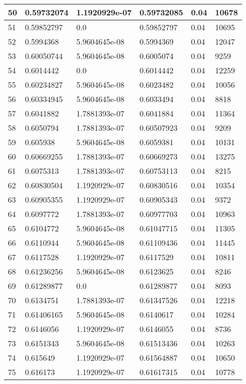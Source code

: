 \begin{longtable}{|l|l|l|l|l|l|}
50 & 0.59732074 & 1.1920929e-07 & 0.59732085 & 0.04 & 10678 \\ \hline 
51 & 0.59852797 & 0.0 & 0.59852797 & 0.04 & 10695 \\ \hline 
52 & 0.5994368 & 5.9604645e-08 & 0.5994369 & 0.04 & 12047 \\ \hline 
53 & 0.60050744 & 5.9604645e-08 & 0.6005074 & 0.04 & 9259 \\ \hline 
54 & 0.6014442 & 0.0 & 0.6014442 & 0.04 & 12259 \\ \hline 
55 & 0.60234827 & 5.9604645e-08 & 0.6023482 & 0.04 & 10056 \\ \hline 
56 & 0.60334945 & 5.9604645e-08 & 0.6033494 & 0.04 & 8818 \\ \hline 
57 & 0.6041882 & 1.7881393e-07 & 0.6041884 & 0.04 & 11364 \\ \hline 
58 & 0.6050794 & 1.7881393e-07 & 0.60507923 & 0.04 & 9209 \\ \hline 
59 & 0.605938 & 5.9604645e-08 & 0.6059381 & 0.04 & 10131 \\ \hline 
60 & 0.60669255 & 1.7881393e-07 & 0.60669273 & 0.04 & 13275 \\ \hline 
61 & 0.6075313 & 1.7881393e-07 & 0.60753113 & 0.04 & 8215 \\ \hline 
62 & 0.60830504 & 1.1920929e-07 & 0.60830516 & 0.04 & 10354 \\ \hline 
63 & 0.60905355 & 1.1920929e-07 & 0.60905343 & 0.04 & 9372 \\ \hline 
64 & 0.6097772 & 1.7881393e-07 & 0.60977703 & 0.04 & 10963 \\ \hline 
65 & 0.6104772 & 5.9604645e-08 & 0.61047715 & 0.04 & 11305 \\ \hline 
66 & 0.6110944 & 5.9604645e-08 & 0.61109436 & 0.04 & 11445 \\ \hline 
67 & 0.6117528 & 1.1920929e-07 & 0.6117529 & 0.04 & 10811 \\ \hline 
68 & 0.61236256 & 5.9604645e-08 & 0.6123625 & 0.04 & 8246 \\ \hline 
69 & 0.61289877 & 0.0 & 0.61289877 & 0.04 & 8093 \\ \hline 
70 & 0.6134751 & 1.7881393e-07 & 0.61347526 & 0.04 & 12218 \\ \hline 
71 & 0.61406165 & 5.9604645e-08 & 0.6140617 & 0.04 & 10284 \\ \hline 
72 & 0.6146056 & 1.1920929e-07 & 0.6146055 & 0.04 & 8736 \\ \hline 
73 & 0.6151343 & 5.9604645e-08 & 0.61513436 & 0.04 & 10263 \\ \hline 
74 & 0.615649 & 1.1920929e-07 & 0.61564887 & 0.04 & 10650 \\ \hline 
75 & 0.616173 & 1.1920929e-07 & 0.61617315 & 0.04 & 10778 \\ \hline 
\end{longtable}